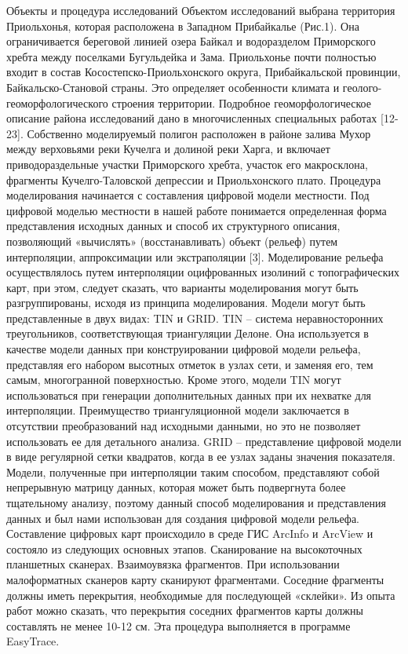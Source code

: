 \documentclass[runningheads]{AIIT}
\begin{document}
Объекты и процедура исследований
Объектом исследований выбрана территория Приольхонья, которая расположена в Западном Прибайкалье (Рис.1). Она ограничивается береговой линией озера Байкал и водоразделом Приморского хребта между поселками Бугульдейка и Зама. Приольхонье почти полностью входит в состав Косостепско-Приольхонского округа, Прибайкальской провинции, Байкальско-Становой страны. Это определяет особенности климата и геолого-геоморфологического строения территории. Подробное геоморфологическое описание района исследований дано в многочисленных специальных работах [12-23]. Собственно моделируемый полигон расположен в районе залива Мухор между верховьями реки Кучелга и долиной реки Харга, и включает приводораздельные участки Приморского хребта, участок его макросклона, фрагменты Кучелго-Таловской депрессии и Приольхонского плато.
Процедура моделирования начинается с составления цифровой модели местности. Под цифровой моделью местности в нашей работе понимается определенная форма представления исходных данных и способ их структурного описания, позволяющий «вычислять» (восстанавливать) объект (рельеф) путем интерполяции, аппроксимации или экстраполяции [3]. Моделирование рельефа осуществлялось путем интерполяции оцифрованных изолиний с топографических карт, при этом, следует сказать, что варианты моделирования могут быть разгруппированы, исходя из принципа моделирования. Модели могут быть представленные в двух видах: TIN и GRID.
TIN – система неравносторонних треугольников, соответствующая триангуляции Делоне. Она используется в качестве модели данных при конструировании цифровой модели рельефа, представляя его набором высотных отметок в узлах сети, и заменяя его, тем самым, многогранной поверхностью. Кроме этого, модели TIN могут использоваться при генерации дополнительных данных при их нехватке для интерполяции. Преимущество триангуляционной модели заключается в отсутствии преобразований над исходными данными, но это не позволяет использовать ее для детального анализа.
GRID – представление цифровой модели в виде регулярной сетки квадратов, когда в ее узлах заданы значения показателя. Модели, полученные при интерполяции таким способом, представляют собой непрерывную матрицу данных, которая может быть подвергнута более тщательному анализу, поэтому данный способ моделирования и представления данных и был нами использован для создания цифровой модели рельефа.
Составление цифровых карт происходило в среде ГИС ArcInfo и ArcView и состояло из следующих основных этапов.
Сканирование на высокоточных планшетных сканерах.
Взаимоувязка  фрагментов. При использовании малоформатных сканеров карту сканируют фрагментами. Соседние фрагменты должны иметь перекрытия, необходимые для последующей «склейки». Из опыта работ можно сказать, что перекрытия соседних фрагментов карты должны составлять не менее 10-12 см. Эта процедура выполняется в программе EasyTrace.
\end{document}
